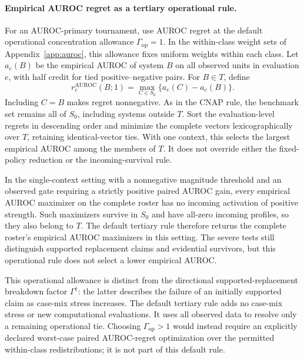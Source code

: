 \documentclass[11pt]{article}
\theoremstyle{remark}
\begin{document}
\paragraph{Empirical AUROC regret as a tertiary operational rule.}
For an AUROC-primary tournament, use AUROC regret at the default operational
concentration allowance $\Gamma_{\mathrm{op}}=1$. In the within-class weight
sets of Appendix~\ref{app:auroc}, this allowance fixes uniform weights within
each class. Let $a_e(B)$ be the empirical AUROC of system $B$ on all observed
units in evaluation $e$, with half credit for tied positive--negative pairs.
For $B\in T$, define
\begin{equation}
r_e^{\mathrm{AUROC}}(B;1)
=\max_{C\in S_0}\{a_e(C)-a_e(B)\}.
\label{eq:operational-auroc-regret}
\end{equation}
Including $C=B$ makes regret nonnegative. As in the CNAP rule, the benchmark
set remains all of $S_0$, including systems outside $T$. Sort the
evaluation-level regrets in descending order and minimize the complete vectors
lexicographically over $T$, retaining identical-vector ties. With one context,
this selects the largest empirical AUROC among the members of $T$. It does
not override either the fixed-policy reduction or the incoming-survival rule.

In the single-context setting with a nonnegative magnitude threshold and an
observed gate requiring a strictly positive paired AUROC gain, every empirical
AUROC maximizer on the complete roster has no incoming activation of positive
strength. Such maximizers survive in $S_0$ and have all-zero incoming profiles,
so they also belong to $T$. The default tertiary rule therefore returns the
complete roster's empirical AUROC maximizers in this setting. The severe tests
still distinguish supported replacement claims and evidential survivors, but
this operational rule does not select a lower empirical AUROC.

This operational allowance is distinct from the directional supported-replacement
breakdown factor $\Gamma^{\dagger}$: the latter describes the failure of an
initially supported claim as case-mix stress increases. The default tertiary
rule adds no case-mix stress or new computational evaluations. It uses all
observed data to resolve only a remaining operational tie. Choosing
$\Gamma_{\mathrm{op}}>1$ would instead require an explicitly declared
worst-case paired AUROC-regret optimization over the permitted within-class
redistributions; it is not part of this default rule.
\end{document}
